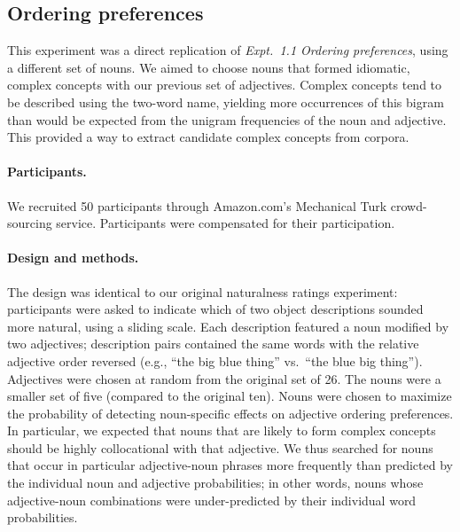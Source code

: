 \documentclass[12pt]{article}
\begin{document}
\subsection{Ordering preferences}

This experiment was a direct replication of \emph{Expt.~1.1 Ordering preferences}, using a different set of nouns. We aimed to choose nouns that formed idiomatic, complex concepts with our previous set of adjectives. Complex concepts tend to be described using the two-word name, yielding more occurrences of this bigram than would be expected from the unigram frequencies of the noun and adjective. This provided a way to extract candidate complex concepts from corpora.


\paragraph{Participants.}

We recruited 50 participants through Amazon.com's Mechanical Turk crowd-sourcing service. Participants were compensated for their participation.

\paragraph{Design and methods.}

The design was identical to our original naturalness ratings experiment: participants were asked to indicate which of two object descriptions sounded more natural, using a sliding scale. Each description featured a noun modified by two adjectives; description pairs contained the same words with the relative adjective order reversed (e.g., ``the big blue thing'' vs.~``the blue big thing''). Adjectives were chosen at random from the original set of 26. The nouns were a smaller set of five (compared to the original ten). Nouns were chosen to maximize the probability of detecting noun-specific effects on adjective ordering preferences. In particular, we expected that nouns that are likely to form complex concepts should be 
highly collocational with that adjective. We thus searched for nouns that occur in particular adjective-noun phrases more frequently than predicted by the individual noun and adjective probabilities; in other words, nouns whose adjective-noun combinations were under-predicted by their individual word probabilities. 
\end{document}
